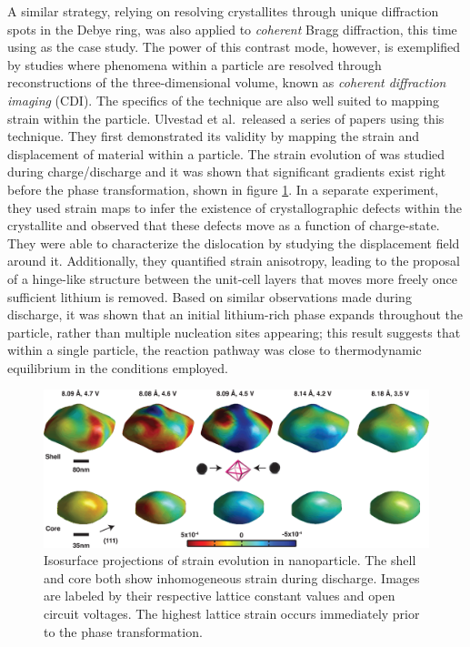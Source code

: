 \documentclass[journal=cmatex,manuscript=perspective]{achemso}
\begin{document}
A similar strategy, relying on resolving crystallites through unique
diffraction spots in the Debye ring, was also applied to
\emph{coherent} Bragg diffraction, this time using
 as the case study\cite{singer2014}. The
power of this contrast mode, however, is exemplified by studies where
phenomena within a particle are resolved through reconstructions of
the three-dimensional volume, known as \emph{coherent diffraction
  imaging} (CDI). The specifics of the technique are also well suited
to mapping strain within the particle. Ulvestad et al.\ released a
series of papers using this technique. They first demonstrated its
validity by mapping the strain and displacement of material within a
particle\cite{ulvestad2014}. The strain evolution of
 was studied during charge/discharge and it
was shown that significant gradients exist right before the phase
transformation, shown in figure
\ref{figure:ulvestad2014-2}\cite{ulvestad2014-2}. In a separate
experiment, they used strain maps to infer the existence of
crystallographic defects within the crystallite and observed that
these defects move as a function of
charge-state\cite{ulvestad2015}. They were able to characterize the
dislocation by studying the displacement field around
it. Additionally, they quantified strain anisotropy, leading to the
proposal of a hinge-like structure between the unit-cell layers that
moves more freely once sufficient lithium is removed. Based on similar
observations made during discharge, it was shown that an initial
lithium-rich phase expands throughout the particle, rather than
multiple nucleation sites appearing; this result suggests that within
a single particle, the reaction pathway was close to thermodynamic
equilibrium in the conditions employed.

\begin{figure}
  \includegraphics[width=\textwidth]{ulvestad2014-2}
  \caption{Isosurface projections of strain evolution in
     nanoparticle. The shell and core both
    show inhomogeneous strain during discharge. Images are labeled by
    their respective lattice constant values and open circuit
    voltages. The highest lattice strain occurs immediately prior to
    the phase transformation.\cite{ulvestad2014-2}}
  \label{figure:ulvestad2014-2}
\end{figure}
\end{document}
